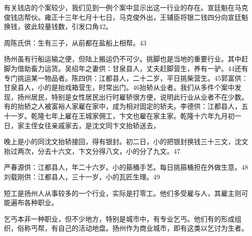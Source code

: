 \noindent 有关钱店的个案较少，我们见到一例个案中显示出这一行业的存在。宣廷魁在马克俊钱店帮伙。雍正十三年七月十七日，马克俊外出，王辅臣将银二钱四分向宣廷魁换钱，彼此较量钱数，引发口角42。


\noindent 周陈氏供：生有三子，从前都在盐船上相帮。43


\noindent 扬州虽有行船运输之便，但陆上搬运仍不可少。挑脚也是当地的重要行业。其中赶脚为借助畜力运货。吴绍年之妻供：甘泉县人，丈夫赶脚营生，养有一驴。44还有专门挑运某一物品者。陈四供：江都县人，二十二岁，平日挑柴营生。45郭富供：甘泉县人，小的是抬戏箱营生，时常出门。46抬轿从业者。我们从多件个案中发现，扬州居民，特别是女性居民出行时雇轿很方便，说明此行业从业者不在少数。有的抬轿之人被富裕人家雇在家中，成为相对固定的轿夫。李德供：江都县人，五十一岁。乾隆七年上雇在王城家佣工，卞文也雇在家主家。乾隆十六年九月初一日，家主侄女往亲戚家去，是沈文同卞文抬轿送去，

\vfill
\begin{BookNotes}
\end{BookNotes}

晚上是小的同沈文抬轿接回，得有银封。初二日，小的把银封换钱三十三文，沈文抬过两次，分去十六文，卞文分得八文，小的分了九文。47


严春源供：江都县人，年二十六岁。小的箍桶手艺。每日挑箍桶担在外做生意。48刘载刚供：江都县人，三十一岁，小的瓦匠生理。49


\noindent 短工是扬州人从事较多的一个行业，实际是打零工。他们多受雇与人，其雇主则可能遍布各种职业。


\noindent 乞丐本非一种职业，但不少地方，特别是城市中，有专业乞丐。他们有的形成组织，俗称丐帮，有自己的活动地盘。扬州作为商业城市，即有这类以乞讨为生者。

